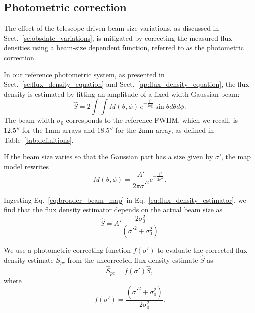 \subsection{Photometric correction}
\label{se:photometric_correction}

The effect of the telescope-driven beam size variations, as discussed
in Sect.~\ref{se:obsdate_variations}, is mitigated by correcting the measured flux
densities using a beam-size dependent function, referred to as the
photometric correction.


In our reference photometric system, as presented in
Sect.~\ref{se:flux_density_equation} and
Sect.~\ref{ap:flux_density_equation},
the flux density is estimated by fitting an amplitude of a fixed-width
Gaussian beam:
\begin{equation}
  \hat{S}  = 2 \int \int M(\theta, \phi)\, e^{-\frac{\theta^{2}}{2\sigma_{0}^{2}}} \sin \theta d\theta d\phi.
  \label{eq:flux_density_estimator}
\end{equation}
The beam width $\sigma_{0}$ corresponds to the
reference FWHM, which we recall,  is $12.5''$ for the 1mm arrays and $18.5''$ for
the 2mm array, as defined in Table~\ref{tab:definitions}.



If the beam size varies so that the Gaussian part has a size given by
$\sigma ’$, the map model rewrites  
\begin{equation}
  M(\theta, \phi) = \frac{A'}{2 \pi \sigma'^{2}} e^{-\frac{\theta^{2}}{2\sigma'^{2}}}.
  \label{eq:broader_beam_map}
\end{equation}

Ingesting Eq.~\ref{eq:broader_beam_map} in
Eq.~\ref{eq:flux_density_estimator}, we find that the flux density
estimator depends on the actual beam size as
\begin{equation}
  \hat{S}  = A' \frac{2 \sigma_0^2}{(\sigma'^2 + \sigma_0^2)}
\end{equation}


We use a photometric correcting function $f(\sigma')$ to evaluate the corrected flux density estimate $\hat{S}_{pc}$ from the
uncorrected flux density estimate $\hat{S}$ as
\begin{equation}
  \hat{S}_{pc} = f(\sigma')\hat{S},
\end{equation} 
where
\begin{equation}
  f(\sigma') = \frac{(\sigma'^2 + \sigma_0^2)}{2 \sigma_0^2}. 
\end{equation} 



